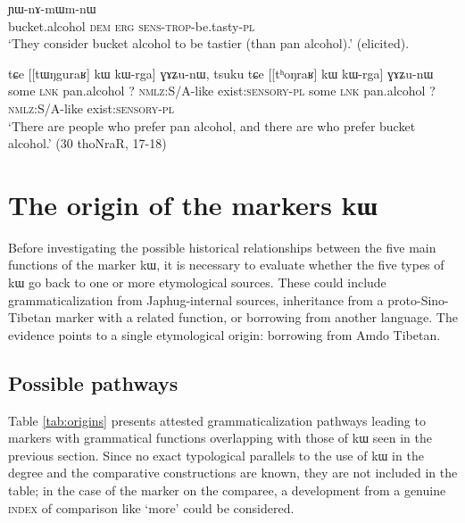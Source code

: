 \documentclass[oldfontcommands,oneside,a4paper,11pt]{article}
\newcommand{\ipa}[1]{{\phon #1}} %
\begin{document}
\begin{exe}
\ex \label{ex:nAmWm}
\gll  [\ipa{tʰoŋraʁ} 	\ipa{nɯ}] 	\ipa{kɯ} 	\ipa{ɲɯ-nɤ-mɯm-nɯ} \\
 bucket.alcohol \textsc{dem} \textsc{erg}  \textsc{sens-trop}-be.tasty-\textsc{pl} \\
 \glt `They consider  bucket alcohol to be tastier (than pan alcohol).'  (elicited).
\end{exe}

\begin{exe}
\ex \label{ex:kWrga}
\gll \ipa{tsuku}   	\ipa{tɕe}   	 [[\ipa{tɯŋguraʁ}]   	\ipa{kɯ}   	\ipa{kɯ-rga}]   	\ipa{ɣɤʑu-nɯ,}   		\ipa{tsuku}   	\ipa{tɕe}   	[[\ipa{tʰoŋraʁ}]   	\ipa{kɯ}   	\ipa{kɯ-rga}]   	\ipa{ɣɤʑu-nɯ}   \\
some \textsc{lnk} pan.alcohol ?{ } \textsc{nmlz:S/A}-like exist\textsc{:sensory}-\textsc{pl} some \textsc{lnk} pan.alcohol ?{ } \textsc{nmlz:S/A}-like exist\textsc{:sensory}-\textsc{pl} \\
\glt `There are people who prefer pan alcohol, and there are who prefer bucket alcohol.' (30 thoNraR, 17-18)
\end{exe}


%
 
 
 
 \section{The origin of the markers \ipa{kɯ}}
Before investigating the possible historical relationships between the five main functions of the marker \ipa{kɯ},  it is necessary to evaluate whether the five types of \ipa{kɯ} go back to one or more etymological sources. These could include grammaticalization from Japhug-internal sources,  inheritance from a proto-Sino-Tibetan  marker with a related function, or borrowing from another language. The evidence points to a single etymological origin: borrowing from Amdo Tibetan.

\subsection{Possible pathways}
Table \ref{tab:origins} presents attested grammaticalization pathways leading to markers with grammatical functions overlapping with those of \ipa{kɯ} seen in the previous section. Since no exact typological parallels  to the use of \ipa{kɯ} in the degree and the comparative constructions are known, they are not included in the table; in the case of the marker on the comparee, a development from a genuine \textsc{index} of comparison like `more'  could be considered.
\end{document}
